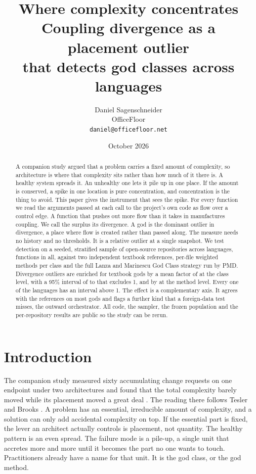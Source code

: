 \documentclass[11pt,a4paper]{article}
\title{\bfseries Where complexity concentrates\\
Coupling divergence as a placement outlier\\
that detects god classes across \nLangs{} languages}
\author{Daniel Sagenschneider\\\small OfficeFloor\\\small\texttt{daniel@officefloor.net}}
\date{October 2026}
\begin{document}
\maketitle

\begin{abstract}
\noindent
A companion study \cite{conserved} argued that a problem carries a fixed amount of
complexity, so architecture is where that complexity sits rather than how much of
it there is. A healthy system spreads it. An unhealthy one lets it pile up in one
place. If the amount is conserved, a spike in one location is pure concentration,
and concentration is the thing to avoid. This paper gives the instrument that sees
the spike. For every function we read the arguments passed at each call to the
project's own code as flow over a control edge. A function that pushes out more
flow than it takes in manufactures coupling. We call the surplus its divergence.
A god is the dominant outlier in divergence, a place where flow is created rather
than passed along. The measure needs no history and no thresholds. It is a
relative outlier at a single snapshot. We test detection on a seeded, stratified
sample of \nMeasured{} open-source repositories across \nLangs{} languages,
\nFuncs{} functions in all, against two independent textbook references, per-file
weighted methods per class and the full Lanza and Marinescu God Class strategy run
by PMD. Divergence outliers are enriched for textbook gods by a mean factor of
\classLift{} at the class level, with a 95\% interval of \classLo{} to \classHi{}
that excludes 1, and by \methodLift{} at the method level. Every one of the
\nLangs{} languages has an interval above 1. The effect is a complementary axis.
It agrees with the references on most gods and flags a further kind that a
foreign-data test misses, the outward orchestrator. All code, the sampler, the
frozen population and the per-repository results are public so the study can be
rerun.
\end{abstract}

\section{Introduction}
The companion study measured sixty accumulating change requests on one endpoint
under two architectures and found that the total complexity barely moved while its
placement moved a great deal \cite{conserved}. The reading there follows Tesler and
Brooks \cite{tesler,brooks}. A problem has an essential, irreducible amount of
complexity, and a solution can only add accidental complexity on top. If the
essential part is fixed, the lever an architect actually controls is placement,
not quantity. The healthy pattern is an even spread. The failure mode is a pile-up,
a single unit that accretes more and more until it becomes the part no one wants to
touch. Practitioners already have a name for that unit. It is the god class, or the
god method.
\end{document}

